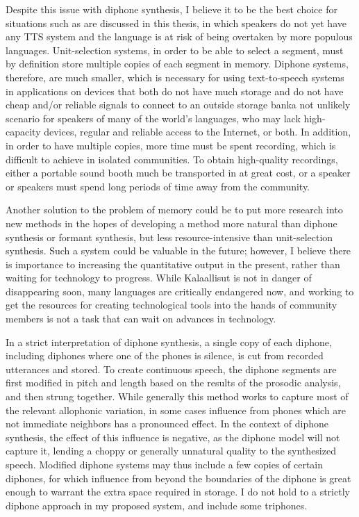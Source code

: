 \documentclass[12pt]{article}
\begin{document}
	Despite this issue with diphone synthesis, I believe it to be the best choice for situations such as are discussed in this thesis, in which speakers do not yet have any TTS system and the language is at risk of being overtaken by more populous languages. Unit-selection systems, in order to be able to select a segment, must by definition store multiple copies of each segment in memory. Diphone systems, therefore, are much smaller, which is necessary for using text-to-speech systems in applications on devices that both do not have much storage and do not have cheap and/or reliable signals to connect to an outside storage bank\textemdash a not unlikely scenario for speakers of many of the world's languages, who may lack high-capacity devices, regular and reliable access to the Internet, or both. In addition, in order to have multiple copies, more time must be spent recording, which is difficult to achieve in isolated communities. To obtain high-quality recordings, either a portable sound booth much be transported in at great cost, or a speaker or speakers must spend long periods of time away from the community. \par

	Another solution to the problem of memory could be to put more research into new methods in the hopes of developing a method more natural than diphone synthesis or formant synthesis, but less resource-intensive than unit-selection synthesis. Such a system could be valuable in the future; however, I believe there is importance to increasing the quantitative output in the present, rather than waiting for technology to progress. While Kalaallisut is not in danger of disappearing soon, many languages are critically endangered now, and working to get the resources for creating technological tools into the hands of community members is not a task that can wait on advances in technology. \par

	In a strict interpretation of diphone synthesis, a single copy of each diphone, including diphones where one of the phones is silence, is cut from recorded utterances and stored. To create continuous speech, the diphone segments are first modified in pitch and length based on the results of the prosodic analysis, and then strung together. While generally this method works to capture most of the relevant allophonic variation, in some cases influence from phones which are not immediate neighbors has a pronounced effect. In the context of diphone synthesis, the effect of this influence is negative, as the diphone model will not capture it, lending a choppy or generally unnatural quality to the synthesized speech. Modified diphone systems may thus include a few copies of certain diphones, for which influence from beyond the boundaries of the diphone is great enough to warrant the extra space required in storage. I do not hold to a strictly diphone approach in my proposed system, and include some triphones. \par
\end{document}
